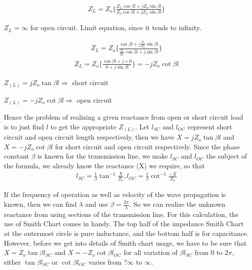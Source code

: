 \begin{align*}
Z_{L} = Z_o \{ \frac{Z_{L}\cos\beta l + jZ_o\sin\beta l}{Z_o\cos\beta l + jZ_{L}\sin\beta l}\}  
\end{align*}
\begin{center}
	$Z_{L} = \infty$ for open circuit. Limit equation, since it tends to infinity. 
\end{center}
\begin{align*}
Z_{L} = Z_o \{ \frac{\cos\beta l + j\frac{Z_o}{Z_{L}}\sin\beta l}{\frac{Z_o}{Z_{L}}\cos\beta l + j\sin\beta l}\}  
\end{align*}
\begin{align}
Z_{L} = Z_o \{ \frac{\cos\beta l + j \times 0}{0 + j\sin\beta l}\} = -jZ_o\cot\beta l  
\end{align}
\begin{center}
	$ Z_{(L)} = jZ_o\tan\beta l \Rightarrow $ short circuit\\ 
\end{center}

\begin{center}
	$ Z_{(L)} = -jZ_o\cot\beta l \Rightarrow $ open circuit
\end{center}
Hence the problem of realizing a given reactance from open or short circuit load is to just find $ l $ to get the appropriate $Z_{(L)}$. 
Let $l_{SC}$ and $l_{OC}$ represent short circuit and open circuit length respectively, then we have $ X = jZ_o\tan\beta l $ and $ X = -jZ_o\cot\beta l $ for short circuit and open circuit respectively. Since the phase constant $ \beta $ is known for the transmission line, we make $ l_{SC} $ and $ l_{OC} $ the subject of the formula, we already know the reactance (X) we require, so that 
\begin{align}
l_{SC} = \frac{1}{\beta}\tan^{-1}\frac{X}{Z_o}, l_{OC} = \frac{1}{\beta}\cot^{-1}\frac{-X}{Z_o}
\end{align}

If the frequency of operation as well as velocity of the wave propagation is known, then we can find $\lambda$ and use $ \beta = \frac{2\pi}{\lambda} $. So we can realize the unknown reactance from using sections of the transmission line. For this calculation, the use of Smith Chart comes in handy. The top half of the impedance Smith Chart at the 
outermost circle is pure inductance, and the bottom half is for capacitance.
However, before we get into details of Smith chart usage, we have to be sure that $ X = Z_o\tan\beta l_{SC} $ and $ X = -Z_o\cot\beta l_{OC} $ for all variation of $ \beta l_{SC} $  from 0 to $ 2\pi $, either $ \tan\beta l_{SC} $ or $ \cot\beta l_{OC} $ varies from $ ?\infty$ to $\infty $.\\

